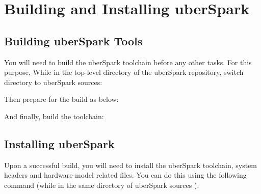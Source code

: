 \documentclass[letterpaper,10pt,english]{sphinxmanual}
\begin{document}
\chapter{Building and Installing uberSpark}
\label{\detokenize{build-install:building-and-installing-uberspark}}\label{\detokenize{build-install::doc}}

\section{Building uberSpark Tools}
\label{\detokenize{build-install:building-uberspark-tools}}
You will need to build the uberSpark toolchain before any other tasks.
For this purpose, While in the top-level directory of the uberSpark repository,
switch directory to uberSpark sources:

\begin{sphinxVerbatim}[commandchars=\\\{\}]
 
\end{sphinxVerbatim}

Then prepare for the build as below:

\begin{sphinxVerbatim}[commandchars=\\\{\}]
\end{sphinxVerbatim}

And finally, build the toolchain:

\begin{sphinxVerbatim}[commandchars=\\\{\}]
\end{sphinxVerbatim}


\section{Installing uberSpark}
\label{\detokenize{build-install:installing-uberspark}}
Upon a successful build, you will need to install the uberSpark toolchain,
system headers and hardware-model related files. You can do this using the
following command (while in the same directory of uberSpark sources ):

\begin{sphinxVerbatim}[commandchars=\\\{\}]
  
\end{sphinxVerbatim}
\end{document}
